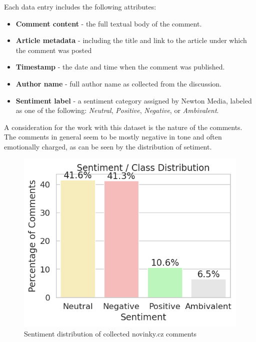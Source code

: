 \documentclass[twoside]{ctuthesis}
\theoremstyle{plain}
\theoremstyle{definition}
\theoremstyle{note}
\begin{document}
Each data entry includes the following attributes:
\begin{itemize}
    \item \textbf{Comment content} - the full textual body of the comment.
    
    \item \textbf{Article metadata} - including the title and link to the article under which the comment was posted
    
    \item \textbf{Timestamp} - the date and time when the comment was published.
    
    \item \textbf{Author name} - full author name as collected from the discussion.
    
    \item \textbf{Sentiment label} - a sentiment category assigned by Newton Media, labeled as one of the following: \textit{Neutral}, \textit{Positive}, \textit{Negative}, or \textit{Ambivalent}.
\end{itemize}

A consideration for the work with this dataset is the nature of the comments. The comments in general seem to be mostly negative in tone and often emotionally charged, as can be seen by the distribution of setiment.

\begin{figure}[htbp]          
	\centering                 
	\includegraphics[scale=0.7]{figures/sentiment.png}
	\caption{Sentiment distribution of collected novinky.cz comments}    
	\label{fig:myplot}          
\end{figure}
\end{document}
